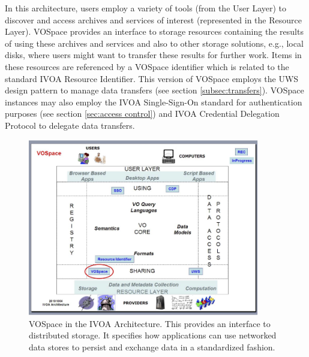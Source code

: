\documentclass[11pt,a4paper]{ivoa}
\begin{document}
In this architecture, users employ a variety of tools (from the User Layer) to discover and access archives and services of interest (represented in the Resource Layer). VOSpace provides an interface to storage resources containing the results of using these archives and services and also to other storage solutions, e.g., local disks, where users might want to transfer these results for further work. Items in these resources are referenced by a VOSpace identifier which is related to the standard IVOA Resource Identifier. This version of VOSpace employs the UWS design pattern \citep{std:UWS} to manage data transfers (see section \ref{subsec:transfers}). VOSpace instances may also employ the IVOA Single-Sign-On standard \citep{std:SSOAUTH2} for authentication purposes (see section \ref{sec:access control}) and IVOA Credential Delegation Protocol \citep{std:CDP} to delegate data transfers.

\begin{figure}
\centering
\includegraphics[width=0.9\textwidth]{archdiag.png}
\caption{VOSpace in the IVOA Architecture. This provides an interface to distributed storage. It specifies how applications can use networked data stores to persist and exchange data in a standardized fashion.}
\label{fig:archdiag}
\end{figure}

\end{document}
